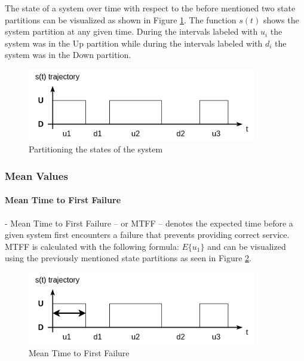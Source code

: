 The state of a system over time with respect to the before mentioned two state partitions can be visualized as shown in Figure \ref{fig:system_state_partitions}. The function \(s(t)\) shows the system partition at any given time. During the intervals labeled with \(u_i\) the system was in the Up partition while during the intervals labeled with \(d_i\) the system was in the Down partition.


\begin{figure}[h]
	\centering
	\includegraphics[width=100mm, keepaspectratio]{figures/system_state_partitions.png}
	\caption{ Partitioning the states of the system \cite{DependabilityBMEMIT} }
	\label{fig:system_state_partitions}
\end{figure}

\subsubsection{Mean Values} \label{background-dep-metrics-mean-values}

\paragraph{Mean Time to First Failure} - Mean Time to First Failure -- or MTFF -- denotes the expected time before a given system first encounters a failure that prevents providing correct service. MTFF is calculated with the following formula: \(E\{u_1\}\) and can be visualized using the previously mentioned state partitions as seen in Figure \ref{fig:mtff}.

\begin{figure}[h]
	\centering
	\includegraphics[width=100mm, keepaspectratio]{figures/MTFF.png}
	\caption{ Mean Time to First Failure \cite{DependabilityBMEMIT} }
	\label{fig:mtff}
\end{figure}

